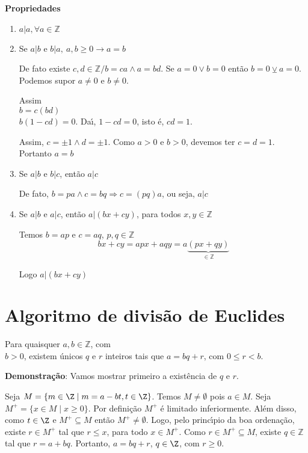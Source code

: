 \textbf{Propriedades}
\begin{enumerate}
\item $a|a, \forall a\in\mathbb{Z}$
\item Se $a|b$ e $b|a,\ a,b\geq 0\rightarrow a=b$

De fato existe $c,d\in\mathbb{Z}/b=ca\wedge a=bd$. Se $a=0\vee b=0$ ent{\~a}o $b=0\veebar a=0$. Podemos supor $a\neq 0$ e $b\neq 0$.

Assim\\
$b=c(bd)$\\
$b(1-cd)=0$. Da{\'\i}, $1-cd=0$, isto {\'e}, $cd=1$.

Assim, $c=\pm 1\wedge d=\pm 1$. Como $a>0$ e $b>0$, devemos ter $c=d=1$. Portanto $a=b$
\item Se $a|b$ e $b|c$, ent{\~a}o $a|c$

De fato, $b=pa\wedge c=bq \Rightarrow c=(pq)a$, ou seja, $a|c$
\item Se $a|b$ e $a|c$, ent{\~a}o $a|(bx+cy)$, para todos $x,y\in\mathbb{Z}$

Temos $b=ap$ e $c=aq$, $p,q\in\mathbb{Z}$
\[bx+cy=apx+aqy=a\underbrace{(px+qy)}_{\in\mathbb{Z}}\]

Logo $a|(bx+cy)$
\end{enumerate}

\section{Algoritmo de divis{\~a}o de Euclides}

\begin{teorema} Para quaisquer $a,b\in\mathbb{Z}$, com\\ $b>0$, existem {\'u}nicos $q$ e $r$ inteiros tais que $a=bq+r$, com $0\leq r<b$.\end{teorema}

\textbf{Demonstra{\c c}{\~a}o}: Vamos mostrar primeiro a exist{\^e}ncia de $q$ e $r$.

Seja $M = \{m \in \Z \mid m = a - bt, t \in \Z\}$. Temos $M \ne \emptyset$ pois $a \in M$. Seja $M^+ = \{x \in M \mid x \ge 0\}$. Por defini\c{c}\~ao $M^{+}$ {\'e} limitado inferiormente. Al\'em disso, como $t \in \Z$ e $M^+ \subseteq M$ ent\~ao $M^+ \ne \emptyset$. Logo, pelo princ{\'\i}pio da boa ordena{\c c}{\~a}o, existe $r \in M^{+}$ tal que $r\leq x$, para todo $x \in M^{+}$. Como $r\in M^{+}\subseteq M$, existe $q\in\mathbb{Z}$ tal que $r = a+bq$. Portanto, $a = bq+r$, $q \in \Z$, com $r \ge 0$.

